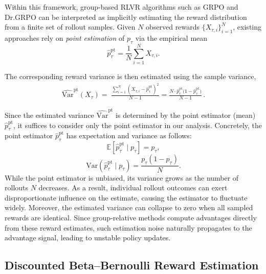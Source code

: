 Within this framework, group-based RLVR algorithms such as GRPO and Dr.GRPO can be interpreted as implicitly estimating the reward distribution from a finite set of rollout samples. Given $N$ observed rewards $\{X_{\tau,i}\}_{i=1}^{N}$, existing approaches rely on \textit{point estimation} of $p_\tau$ via the empirical mean 
\begin{equation}
\hat{p}_\tau^\mathrm{pt} = \frac{1}{N} \sum_{i=1}^{N} X_{\tau,i}.
\end{equation}

The corresponding reward variance is then estimated using the sample variance,
\begin{equation}
\begin{aligned}
\widehat{\mathrm{Var}}^{\mathrm{pt}}(X_{\tau})
=\;
\frac{\sum_{i=1}^{N}
\left(X_{\tau,i} - \hat{p}_\tau^{\mathrm{pt}}\right)^2}{N-1}
=
\frac{N \cdot \hat{p}_\tau^{\mathrm{pt}}
\bigl(1 - \hat{p}_\tau^{\mathrm{pt}}\bigr)}{N-1}\,
.
\end{aligned}
\end{equation}

Since the estimated variance $\widehat{\mathrm{Var}}^{\mathrm{pt}}$ is determined by the point estimator (mean) $\hat{p}_\tau^\mathrm{pt}$, it suffices to consider only the point estimator in our analysis.
Concretely, the point estimator $\hat{p}_\tau^\mathrm{pt}$ has expectation and variance as follows:
\begin{equation}
\mathbb{E}[\hat{p}_\tau^\mathrm{pt} \mid p_\tau] = p_\tau,
\end{equation}
\begin{equation}
\mathrm{Var}(\hat{p}_\tau^\mathrm{pt} \mid p_\tau) = \frac{p_\tau(1-p_\tau)}{N}.
\label{eq:var_pt}
\end{equation}
While the point estimator is unbiased, its variance grows as the number of rollouts $N$ decreases. As a result, individual rollout outcomes can exert disproportionate influence on the estimate, causing the estimator to fluctuate widely. Moreover, the estimated variance can collapse to zero when all sampled rewards are identical. Since group-relative methods compute advantages directly from these reward estimates, such estimation noise naturally propagates to the advantage signal, leading to unstable policy updates.


\subsection{Discounted Beta--Bernoulli Reward Estimation}
\label{subsec:grpohistbeta}

